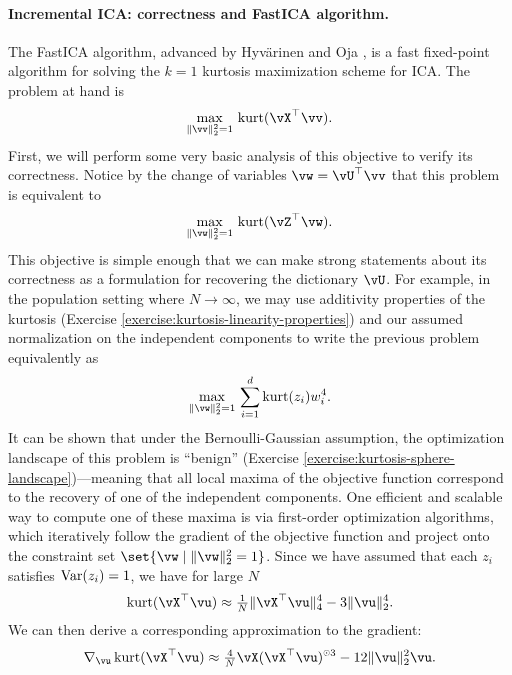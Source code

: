 \documentclass[\toplevelprefix/book-main.tex]{subfiles}
\begin{document}
\paragraph{Incremental ICA: correctness and FastICA algorithm.}
The FastICA algorithm, advanced by Hyv\"{a}rinen and Oja \cite{hyvarinen-1997}, is a fast fixed-point algorithm for solving the $k=1$ kurtosis maximization scheme for ICA.
The problem at hand is
\begin{equation}\label{eq:kurtosis-maximization-sphere-finitesample}
    \max_{\norm{\vv}_2^2 = 1}\, \kurt(\vX^\top \vv).
\end{equation}
First, we will perform some very basic analysis of this objective to verify its correctness. Notice by the change of variables $\vw = \vU^\top \vv$ that this problem is equivalent to
\begin{equation*}
    \max_{\norm{\vw}_2^2 = 1}\, 
    \mathrm{kurt}(\vZ^\top \vw).
\end{equation*}
This objective is simple enough that we can make strong statements about its correctness as a formulation for recovering the dictionary $\vU$.
For example, in the population setting where $N \to \infty$, 
we may use additivity properties of the kurtosis (Exercise \ref{exercise:kurtosis-linearity-properties}) and our assumed normalization on the independent components to write the previous problem equivalently as
\begin{equation}\label{eq:kurtosis-maximization-sphere-population-simple}
    \max_{\norm{\vw}_2^2 = 1}\, 
    \sum_{i=1}^d \mathrm{kurt}(z_i) w_i^4.
\end{equation}
It can be shown that under the Bernoulli-Gaussian assumption, the optimization landscape of this problem is ``benign'' (Exercise \ref{exercise:kurtosis-sphere-landscape})---meaning that all local maxima of the objective function correspond to the recovery of one of the independent components.
One efficient and scalable way to compute one of these maxima is via first-order optimization algorithms, which iteratively follow the gradient of the objective function and project onto the constraint set $\set{\vw \given \norm{\vw}_2^2 = 1}$.
Since we have assumed that each $z_i$ satisfies $\operatorname{Var}(z_i)=1$, we 
have for large $N$
\begin{equation}\label{eq:kurtosis-approximation-l4}
    \kurt(\vX^\top \vu)
    \approx
    \tfrac{1}{N} \norm{\vX^\top \vu}_4^4 - 3 \norm{\vu}_2^4.
\end{equation}
We can then derive a corresponding approximation to the gradient:
\begin{equation*}
    \nabla_{\vu} \kurt(\vX^\top \vu)
    \approx
    \tfrac{4}{N} \vX (\vX^\top \vu)^{\hada 3}
    - 12 \norm{\vu}_2^2 \vu.
\end{equation*}
\end{document}
